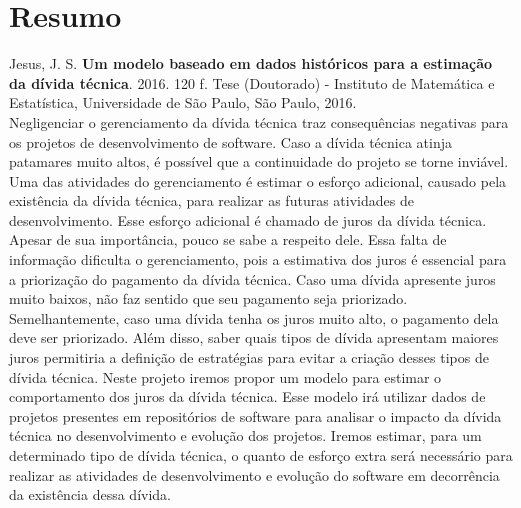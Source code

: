 \documentclass[11pt,twoside,a4paper]{book}
\begin{document}





\chapter*{Resumo}

\noindent Jesus, J. S. \textbf{Um modelo baseado em dados históricos para a estimação da dívida técnica}. 
2016. 120 f.
Tese (Doutorado) - Instituto de Matemática e Estatística,
Universidade de São Paulo, São Paulo, 2016.
\\

Negligenciar o gerenciamento da dívida técnica traz consequências negativas para os projetos de desenvolvimento de software. Caso a dívida técnica atinja patamares muito altos, é possível que a continuidade do projeto se torne inviável.
Uma das atividades do gerenciamento é estimar o esforço adicional, causado pela existência da dívida técnica, para realizar as futuras atividades de desenvolvimento. Esse esforço adicional é chamado de juros da dívida técnica. Apesar de sua importância, pouco se sabe a respeito dele. Essa falta de informação dificulta o gerenciamento, pois a estimativa dos juros é essencial para a priorização do pagamento da dívida técnica. Caso uma dívida apresente  juros muito baixos, não faz sentido que seu pagamento seja priorizado. Semelhantemente, caso uma dívida tenha os juros muito alto, o pagamento dela deve ser priorizado. Além disso, saber quais tipos de dívida apresentam maiores juros permitiria a definição de estratégias para evitar a criação desses tipos de dívida técnica. Neste projeto iremos propor um modelo para estimar o comportamento dos juros da dívida técnica. Esse modelo irá utilizar dados de projetos presentes em repositórios de software para analisar o impacto da dívida técnica no desenvolvimento e evolução dos projetos. Iremos estimar, para um determinado tipo de dívida técnica, o quanto de esforço extra será necessário para realizar as atividades de desenvolvimento e evolução do software em decorrência da existência dessa dívida.
\\
\end{document}
